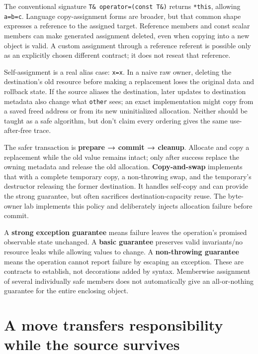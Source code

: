 The conventional signature \texttt{T\&\ operator=(const\ T\&)} returns \texttt{*this}, allowing \texttt{a=b=c}. Language copy-assignment forms are broader, but that common shape expresses a reference to the assigned target. Reference members and const scalar members can make generated assignment deleted, even when copying into a new object is valid. A custom assignment through a reference referent is possible only as an explicitly chosen different contract; it does not reseat that reference.

Self-assignment is a real alias case: \texttt{x=x}. In a naive raw owner, deleting the destination's old resource before making a replacement loses the original data and rollback state. If the source aliases the destination, later updates to destination metadata also change what \texttt{other} sees; an exact implementation might copy from a saved freed address or from its new uninitialized allocation. Neither should be taught as a safe algorithm, but don't claim every ordering gives the same use-after-free trace.

The safer transaction is \textbf{prepare → commit → cleanup}. Allocate and copy a replacement while the old value remains intact; only after success replace the owning metadata and release the old allocation. \textbf{Copy-and-swap} implements that with a complete temporary copy, a non-throwing swap, and the temporary's destructor releasing the former destination. It handles self-copy and can provide the strong guarantee, but often sacrifices destination-capacity reuse. The byte-owner lab implements this policy and deliberately injects allocation failure before commit.

A \textbf{strong exception guarantee} means failure leaves the operation's promised observable state unchanged. A \textbf{basic guarantee} preserves valid invariants/no resource leaks while allowing values to change. A \textbf{non-throwing guarantee} means the operation cannot report failure by escaping an exception. These are contracts to establish, not decorations added by syntax. Memberwise assignment of several individually safe members does not automatically give an all-or-nothing guarantee for the entire enclosing object.

\section{A move transfers responsibility while the source survives}\label{05-engine-i-ch003-a-move-transfers-responsibility-while-the-source-survives}


